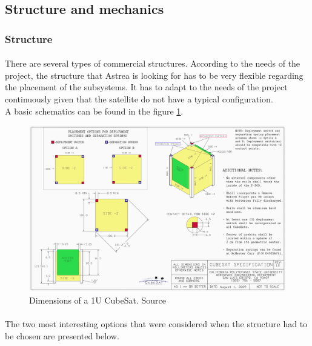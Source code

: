 \subsection{Structure and mechanics}

\subsubsection{Structure}

\paragraph{}There are several types of commercial structures. According to the needs of the project, the structure that Astrea is looking for has to be very flexible regarding the placement of the subsystems. It has to adapt to the needs of the project continuously given that the satellite do not have a typical configuration.\\
A basic schematics can be found in the figure \ref{epsschematics}.

\begin{figure}[h!]
\includegraphics[scale=0.6]{./ANNEXES/images/CubeSatDesign}
\centering
\caption{Dimensions of a 1U CubeSat. Source \cite{cubesatdimensions}}
\label{epsschematics}
\end{figure}

\paragraph{}The two most interesting options that were considered when the structure had to be chosen are presented below.

